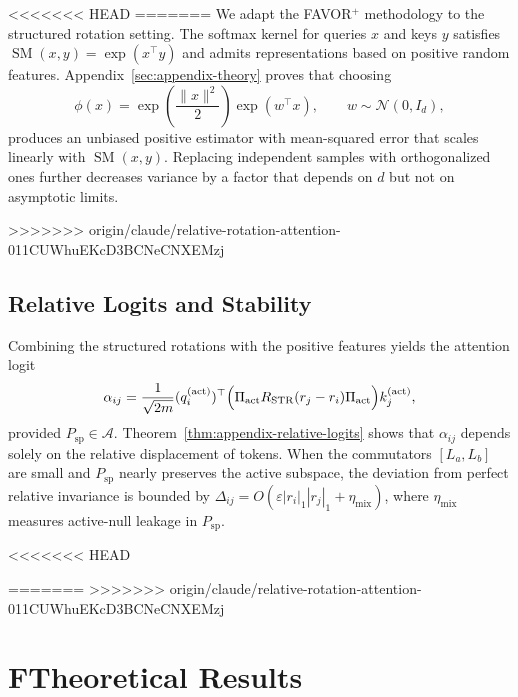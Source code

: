 \documentclass[11pt]{article}
\begin{document}
<<<<<<< HEAD
=======
We adapt the FAVOR$^+$ methodology to the structured rotation setting. The softmax kernel for
queries $x$ and keys $y$ satisfies $\operatorname{SM}(x,y) = \exp(x^\top y)$ and admits representations
based on positive random features. Appendix~\ref{sec:appendix-theory} proves that choosing
\[
\phi(x) = \exp\left(\frac{\|x\|^2}{2}\right) \exp(w^\top x),
\qquad w \sim \mathcal{N}(0,I_d),
\]
produces an unbiased positive estimator with mean-squared error that scales linearly with $\operatorname{SM}(x,y)$.
Replacing independent samples with orthogonalized ones further decreases variance by a factor that
depends on $d$ but not on asymptotic limits.

>>>>>>> origin/claude/relative-rotation-attention-011CUWhuEKcD3BCNeCNXEMzj
\subsection{Relative Logits and Stability}

Combining the structured rotations with the positive features yields the attention logit
\[
\alpha_{ij}
= \frac{1}{\sqrt{2m}} (q_i^{(\mathrm{act})})^\top
  \Bigl(\Pi_{\mathrm{act}} R_{\mathrm{STR}}(r_j - r_i) \Pi_{\mathrm{act}}\Bigr)
  k_j^{(\mathrm{act})},
\]
provided $P_{\mathrm{sp}}\in\mathcal{A}$. Theorem~\ref{thm:appendix-relative-logits} shows that $\alpha_{ij}$ depends solely on the
relative displacement of tokens. When the commutators $[L_a,L_b]$ are small and
$P_{\mathrm{sp}}$ nearly preserves the active subspace, the deviation from perfect relative invariance is
bounded by $\Delta_{ij} = O(\varepsilon |r_i|_1 |r_j|_1 + \eta_{\mathrm{mix}})$, where $\eta_{\mathrm{mix}}$ measures
active-null leakage in $P_{\mathrm{sp}}$.

<<<<<<< HEAD



=======
>>>>>>> origin/claude/relative-rotation-attention-011CUWhuEKcD3BCNeCNXEMzj

\clearpage
\appendix
\section*{F\quad Theoretical Results}
\label{sec:appendix-theory}
\end{document}
